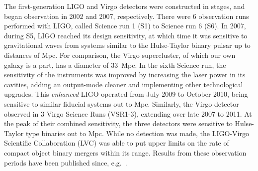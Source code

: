 The first-generation LIGO and Virgo detectors were constructed in stages, and
began observation in 2002 and 2007, respectively. There were 6 observation 
runs performed with LIGO, called Science run 1 (S1) to Science run 6 (S6). 
In 2007, during S5, LIGO reached its design sensitivity, at which time it was sensitive
to gravitational waves from systems similar to the Hulse-Taylor binary pulsar
up to distances of \FILL Mpc. For comparison, the Virgo supercluster, of which 
our own galaxy is a part, has a diameter of 33~Mpc. In the sixth Science run,
the sensitivity of the instruments was improved by increasing the laser power
in its cavities, adding an output-mode cleaner and implementing other 
technological upgrades. This \textit{enhanced} LIGO operated from July 2009
to October 2010, being sensitive to similar fiducial systems out to \FILL Mpc. 
Similarly, the Virgo detector observed in 3 Virgo Science Runs
(VSR1-3), extending over late 2007 to 2011. At the peak of their combined 
sensitivity, the three detectors were sensitive to Hulse-Taylor type binaries out 
to \FILL Mpc. While no detection was made, the LIGO-Virgo Scientific Collaboration
(LVC) was able to put upper limits on the rate of compact object binary mergers
within its range. Results from these observation periods have been published 
since, e.g.~\cite{Messaritaki:2005wv,Abadie:2010mt,Abadie:2012rq,Abbott:2009km,
Colaboration:2011nz,Abadie:2010yb,Abbott:2009qj,Abbott:2009tt,Abadie:2011kd,
Aasi:2012rja,Abbott:2003yq,Abbott:2005pu,Sintes:2005fp,Abadie:2011md,
Palomba:2012wn}. 

